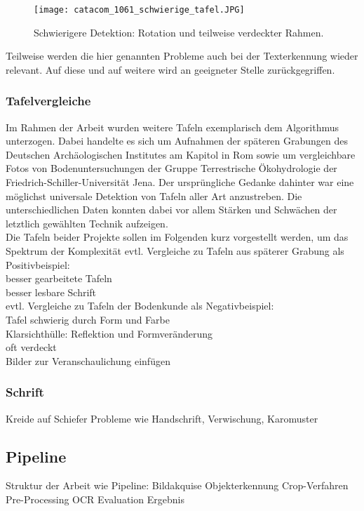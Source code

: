\begin{figure}[!h]
\texttt{[image: catacom\_1061\_schwierige\_tafel.JPG]}
\caption{Schwierigere Detektion: Rotation und teilweise verdeckter Rahmen.}
\label{fig:schwierigetafel}
\end{figure}
Teilweise werden die hier genannten Probleme auch bei der Texterkennung wieder relevant. Auf diese und auf weitere wird an geeigneter Stelle zurückgegriffen.


\subsubsection{Tafelvergleiche}

Im Rahmen der Arbeit wurden weitere Tafeln exemplarisch dem Algorithmus unterzogen. Dabei handelte es sich um Aufnahmen der späteren Grabungen des Deutschen Archäologischen Institutes am Kapitol in Rom sowie um vergleichbare Fotos von Bodenuntersuchungen der Gruppe Terrestrische Ökohydrologie der Friedrich-Schiller-Universität Jena. Der ursprüngliche Gedanke dahinter war eine möglichst universale Detektion von Tafeln aller Art anzustreben. Die unterschiedlichen Daten konnten dabei vor allem Stärken und Schwächen der letztlich gewählten Technik aufzeigen.\\
Die Tafeln beider Projekte sollen im Folgenden kurz vorgestellt werden, um das Spektrum der Komplexität 
evtl. Vergleiche zu Tafeln aus späterer Grabung als Positivbeispiel:\\
besser gearbeitete Tafeln\\
besser lesbare Schrift\\
evtl. Vergleiche zu Tafeln der Bodenkunde als Negativbeispiel:\\
Tafel schwierig durch Form und Farbe\\
Klarsichthülle: Reflektion und Formveränderung\\
oft verdeckt\\
Bilder zur Veranschaulichung einfügen

\subsubsection{Schrift}
Kreide auf Schiefer
Probleme wie Handschrift, Verwischung, Karomuster
\subsection{Pipeline}
Struktur der Arbeit wie Pipeline:
Bildakquise
Objekterkennung
Crop-Verfahren
Pre-Processing
OCR
Evaluation
Ergebnis